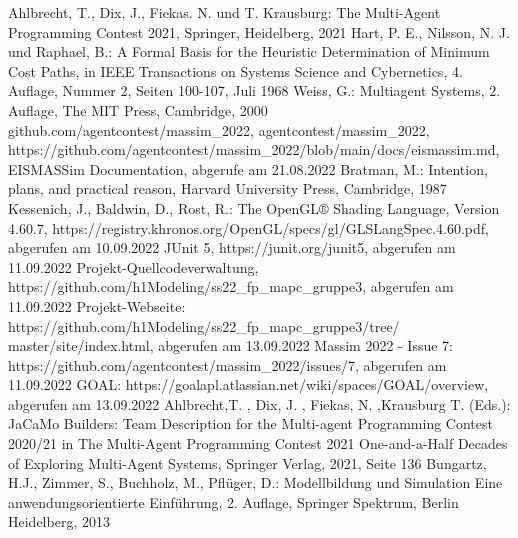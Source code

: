\documentclass[runningheads]{llncs}
\begin{document}
%
%
%
% 
% 
%
\begin{thebibliography}{8}
	Ahlbrecht, T., Dix, J., Fiekas. N. und T. Krausburg: The Multi-Agent Programming Contest 2021, Springer, Heidelberg, 2021
	Hart, P. E., Nilsson, N. J. und Raphael, B.: A Formal Basis for the Heuristic Determination of Minimum Cost Paths, in IEEE Transactions on Systems Science and Cybernetics, 4. Auflage, Nummer 2, Seiten 100-107, Juli 1968
	Weiss, G.: Multiagent Systems, 2. Auflage, The MIT Press, Cambridge, 2000
	github.com/agentcontest/massim\_2022, agentcontest/massim\_2022, \\ https://github.com/agentcontest/massim\_2022/blob/main/docs/eismassim.md, EISMASSim Documentation, abgerufe am 21.08.2022
	Bratman, M.: Intention, plans, and practical reason, Harvard University Press, Cambridge, 1987
	Kessenich, J., Baldwin, D., Rost, R.: The OpenGL® Shading Language, Version 4.60.7, https://registry.khronos.org/OpenGL/specs/gl/GLSLangSpec.4.60.pdf, abgerufen am 10.09.2022
	JUnit 5, https://junit.org/junit5, abgerufen am 11.09.2022
	Projekt-Quellcodeverwaltung, https://github.com/h1Modeling/ss22\_fp\_mapc\_gruppe3, abgerufen am 11.09.2022
	Projekt-Webseite: https://github.com/h1Modeling/ss22\_fp\_mapc\_gruppe3/tree/ master/site/index.html, abgerufen am 13.09.2022
	Massim 2022 - Issue 7: https://github.com/agentcontest/massim\_2022/issues/7, abgerufen am 11.09.2022
	GOAL: https://goalapl.atlassian.net/wiki/spaces/GOAL/overview, abgerufen am 13.09.2022
	Ahlbrecht,T. , Dix, J. , Fiekas, N. ,Krausburg T. (Eds.): JaCaMo Builders: Team Description for the Multi-agent Programming Contest 2020/21  in The Multi-Agent Programming Contest 2021 One-and-a-Half Decades of Exploring Multi-Agent Systems, Springer Verlag, 2021, Seite 136
	Bungartz, H.J., Zimmer, S., Buchholz, M., Pflüger, D.: Modellbildung und Simulation Eine anwendungsorientierte Einführung, 2. Auflage, Springer Spektrum, Berlin Heidelberg, 2013
	
\end{thebibliography}
\end{document}
